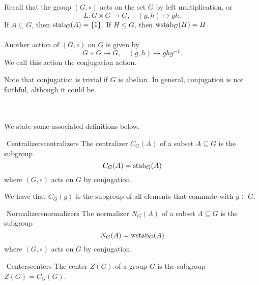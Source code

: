        Recall that the group \((G,\circ)\) acts on the set \(G\) by left multiplication, or
        \begin{equation*}
            L:G\times G\to G, \quad (g,h)\mapsto gh.
        \end{equation*}
        If \(A\subseteq G\), then \(\operatorname{stab}_G(A)=\{1\}\). If \(H\leq G\), then \(\operatorname{wstab}_G(H)=H\).
        \\
        \\
        Another action of \((G,\circ)\) on \(G\) is given by
        \begin{equation*}
            G\times G\to G, \quad (g,h)\mapsto ghg^{-1}.
        \end{equation*}
        We call this action the conjugation action.
        \begin{remark*}
            Note that conjugation is trivial if \(G\) is abelian. In general, conjugation is not faithful, although it could be.
        \end{remark*}
        \vphantom
        \\
        \\
        We state some associated definitions below.
        \begin{definition}{\Stop\,\,Centralizers}{centralizers}
            The centralizer \(C_G(A)\) of a subset \(A\subseteq G\) is the subgroup
            \begin{equation*}
                C_G(A)=\operatorname{stab}_G(A)
            \end{equation*}
            where \((G,\circ)\) acts on \(G\) by conjugation.
        \end{definition}
        \begin{remark*}
            We have that \(C_G(g)\) is the subgroup of all elements that commute with \(g\in G\).
        \end{remark*}
        \begin{definition}{\Stop\,\,Normalizers}{normalizers}
            The normalizer \(N_G(A)\) of a subset \(A\subseteq G\) is the subgroup
            \begin{equation*}
                N_G(A)=\operatorname{wstab}_G(A)
            \end{equation*}
            where \((G,\circ)\) acts on \(G\) by conjugation.
        \end{definition}
        \begin{definition}{\Stop\,\,Centers}{centers}
            The center \(Z(G)\) of a group \(G\) is the subgroup \(Z(G)=C_G(G)\).
        \end{definition}
